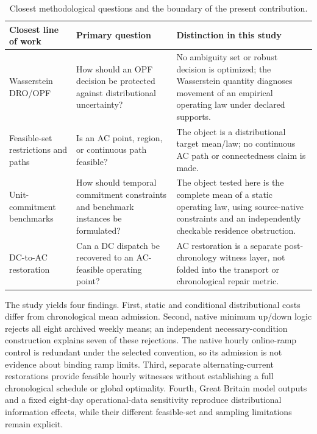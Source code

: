 \documentclass[journal]{IEEEtran}
\begin{document}
\begin{table}[t]
\caption{Closest methodological questions and the boundary of the present contribution.}
\label{tab:noveltymap}
\centering
\scriptsize
\setlength{\tabcolsep}{5pt}
\begin{tabularx}{0.97\textwidth}{>{\raggedright\arraybackslash}p{}>{\raggedright\arraybackslash}p{}X}
\toprule
Closest line of work & Primary question & Distinction in this study\\
\midrule
Wasserstein DRO/OPF \cite{GuoI2019,GuoII2019,DallAnese2018} & How should an OPF decision be protected against distributional uncertainty? & No ambiguity set or robust decision is optimized; the Wasserstein quantity diagnoses movement of an empirical operating law under declared supports.\\
Feasible-set restrictions and paths \cite{LeeRobust2021,LeePath2020,Narimani2025} & Is an AC point, region, or continuous path feasible? & The object is a distributional target mean/law; no continuous AC path or connectedness claim is made.\\
Unit-commitment benchmarks \cite{Knueven2020,PGLibUCRepo} & How should temporal commitment constraints and benchmark instances be formulated? & The object tested here is the complete mean of a static operating law, using source-native constraints and an independently checkable residence obstruction.\\
DC-to-AC restoration \cite{Boateng2027} & Can a DC dispatch be recovered to an AC-feasible operating point? & AC restoration is a separate post-chronology witness layer, not folded into the transport or chronological repair metric.\\
\bottomrule
\end{tabularx}
\end{table}

The study yields four findings. First, static and conditional distributional costs differ from chronological mean admission. Second, native minimum up/down logic rejects all eight archived weekly means; an independent necessary-condition construction explains seven of these rejections. The native hourly online-ramp control is redundant under the selected convention, so its admission is not evidence about binding ramp limits. Third, separate alternating-current restorations provide feasible hourly witnesses without establishing a full chronological schedule or global optimality. Fourth, Great Britain model outputs and a fixed eight-day operational-data sensitivity reproduce distributional information effects, while their different feasible-set and sampling limitations remain explicit.
\end{document}
